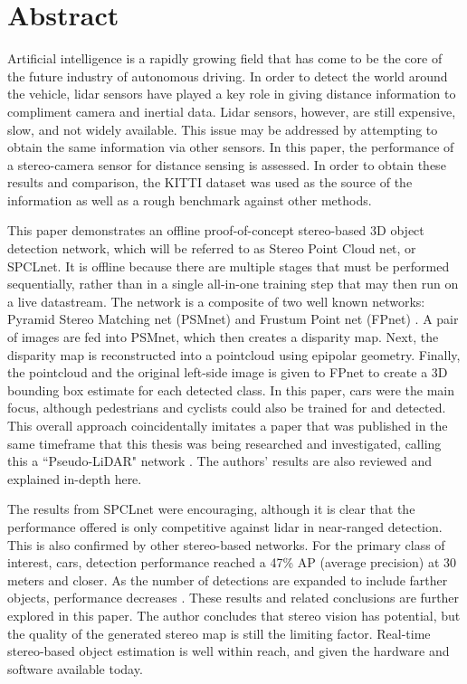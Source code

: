 \section*{Abstract} %

Artificial intelligence is a rapidly growing field that has come to be the core of the future industry of autonomous driving. In order to detect the world around the vehicle, lidar sensors have played a key role in giving distance information to compliment camera and inertial data. Lidar sensors, however, are still expensive, slow, and not widely available. This issue may be addressed by attempting to obtain the same information via other sensors. In this paper, the performance of a stereo-camera sensor for distance sensing is assessed. In order to obtain these results and comparison, the KITTI dataset was used as the source of the information as well as a rough benchmark against other methods. 

This paper demonstrates an offline proof-of-concept stereo-based 3D object detection network, which will be referred to as Stereo Point Cloud net, or SPCLnet. It is offline because there are multiple stages that must be performed sequentially, rather than in a single all-in-one training step that may then run on a live datastream. The network is a composite of two well known networks: Pyramid Stereo Matching net (PSMnet) \cite{chang_pyramid_2018} and Frustum Point net (FPnet) \cite{qi_frustum_2017}. A pair of images are fed into PSMnet, which then creates a disparity map. Next, the disparity map is reconstructed into a pointcloud using epipolar geometry. Finally, the pointcloud and the original left-side image is given to FPnet to create a 3D bounding box estimate for each detected class. In this paper, cars were the main focus, although pedestrians and cyclists could also be trained for and detected. This overall approach coincidentally imitates a paper that was published in the same timeframe that this thesis was being researched and investigated, calling this a ``Pseudo-LiDAR" network \cite{wang_pseudo-lidar_2019}. The authors' results are also reviewed and explained in-depth here.

The results from SPCLnet were encouraging, although it is clear that the performance offered is only competitive against lidar in near-ranged detection. This is also confirmed by other stereo-based networks. For the primary class of interest, cars, detection performance reached a 47\% AP (average precision) at 30 meters and closer. As the number of detections are expanded to include farther objects, performance decreases \cite{wang_pseudo-lidar_2019}. These results and related conclusions are further explored in this paper. The author concludes that stereo vision has potential, but the quality of the generated stereo map is still the limiting factor. Real-time stereo-based object estimation is well within reach, and given the hardware and software available today.

